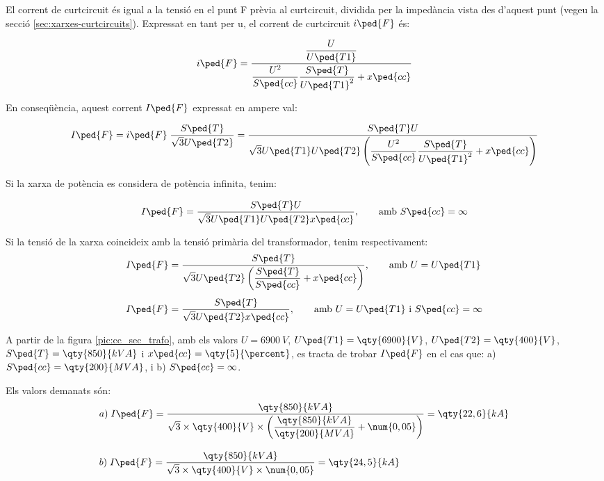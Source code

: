 El corrent de curtcircuit és igual a la tensió en el punt F prèvia al curtcircuit, dividida per la impedància vista des d'aquest punt (vegeu la secció \ref{sec:xarxes-curtcircuits}). Expressat en tant per u, el corrent de curtcircuit $i\ped{F}$ és:

\begin{equation}
    i\ped{F} = \frac{\dfrac{U}{U\ped{T1}}}{\dfrac{U^2}{S\ped{cc}}
    \dfrac{S\ped{T}}{U\ped{T1}^2} + x\ped{cc}}
\end{equation}

En conseqüència, aquest corrent $I\ped{F}$ expressat en ampere val:

\begin{equation}
    I\ped{F} = i\ped{F}\; \frac{S\ped{T}}{\sqrt{3}U\ped{T2}} =
    \frac{S\ped{T} U}{\sqrt{3} U\ped{T1}U\ped{T2}
    \left(\dfrac{U^2}{S\ped{cc}}
    \dfrac{S\ped{T}}{U\ped{T1}^2} + x\ped{cc}\right)}
\end{equation}

Si la xarxa de potència es considera de potència infinita, tenim:

\begin{equation}
    I\ped{F} = \frac{S\ped{T} U}{\sqrt{3} U\ped{T1}U\ped{T2}
    x\ped{cc}},\qquad \text{amb }S\ped{cc}=\infty
\end{equation}

Si  la tensió de la xarxa coincideix amb la tensió primària
del transformador, tenim respectivament:
\begin{align}
    I\ped{F} &= \frac{S\ped{T}}{\sqrt{3} U\ped{T2}
    \left(\dfrac{S\ped{T}}{S\ped{cc}} +
    x\ped{cc}\right)},\qquad \text{amb }U=U\ped{T1}\\[1ex]
    I\ped{F} &= \frac{S\ped{T}}{\sqrt{3} U\ped{T2}
    x\ped{cc}}, \qquad \text{amb }U=U\ped{T1}\text{ i }
    S\ped{cc}=\infty
\end{align}


\begin{exemple}[\CorrentCcSecTrafo{}]
	\addcontentsxms{\CorrentCcSecTrafo}
    A partir de la figura \vref{pic:cc_sec_trafo}, amb els valors
    $U=\qty{6900}{V}$, $U\ped{T1}=\qty{6900}{V}$,
    $U\ped{T2}=\qty{400}{V}$, $S\ped{T}=\qty{850}{kVA}$ i
    $x\ped{cc}=\qty{5}{\percent}$, es tracta de trobar $I\ped{F}$ en el cas
    que: a) $S\ped{cc}=\qty{200}{MVA}$, i b) $S\ped{cc}=\infty$.

    Els valors demanats són:
    \begin{align*}
       &a)\;I\ped{F} = \frac{\qty{850}{kVA}}{\sqrt{3}\times \qty{400}{V}\times
       \left(\dfrac{\qty{850}{kVA}}{\qty{200}{MVA}} +
       \num{0,05}\right)} = \qty{22,6}{kA} \\[2ex]
       &b)\;I\ped{F} = \frac{\qty{850}{kVA}}{\sqrt{3}\times \qty{400}{V}\times
       \num{0,05}} = \qty{24,5}{kA}
    \end{align*}

\end{exemple}



